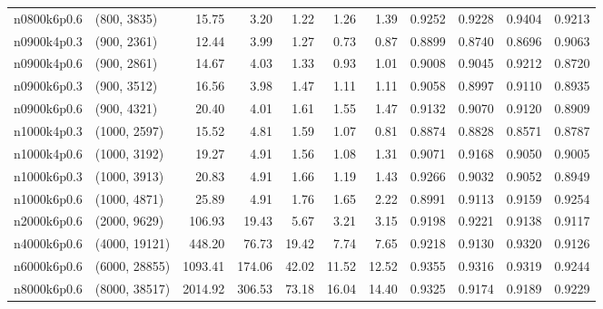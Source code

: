 \begin{tabular}{llrrrrrrrrr}
n0800k6p0.6 &   (800, 3835) &   15.75 &   3.20 &  1.22 &  1.26 &   1.39 &   0.9252 &   0.9228 &     0.9404 &      0.9213 \\
n0900k4p0.3 &   (900, 2361) &   12.44 &   3.99 &  1.27 &  0.73 &   0.87 &   0.8899 &   0.8740 &     0.8696 &      0.9063 \\
n0900k4p0.6 &   (900, 2861) &   14.67 &   4.03 &  1.33 &  0.93 &   1.01 &   0.9008 &   0.9045 &     0.9212 &      0.8720 \\
n0900k6p0.3 &   (900, 3512) &   16.56 &   3.98 &  1.47 &  1.11 &   1.11 &   0.9058 &   0.8997 &     0.9110 &      0.8935 \\
n0900k6p0.6 &   (900, 4321) &   20.40 &   4.01 &  1.61 &  1.55 &   1.47 &   0.9132 &   0.9070 &     0.9120 &      0.8909 \\
n1000k4p0.3 &  (1000, 2597) &   15.52 &   4.81 &  1.59 &  1.07 &   0.81 &   0.8874 &   0.8828 &     0.8571 &      0.8787 \\
n1000k4p0.6 &  (1000, 3192) &   19.27 &   4.91 &  1.56 &  1.08 &   1.31 &   0.9071 &   0.9168 &     0.9050 &      0.9005 \\
n1000k6p0.3 &  (1000, 3913) &   20.83 &   4.91 &  1.66 &  1.19 &   1.43 &   0.9266 &   0.9032 &     0.9052 &      0.8949 \\
n1000k6p0.6 &  (1000, 4871) &   25.89 &   4.91 &  1.76 &  1.65 &   2.22 &   0.8991 &   0.9113 &     0.9159 &      0.9254 \\
n2000k6p0.6 &  (2000, 9629) &  106.93 &  19.43 &  5.67 &  3.21 &   3.15 &   0.9198 &   0.9221 &     0.9138 &      0.9117 \\
n4000k6p0.6 & (4000, 19121) &  448.20 &  76.73 & 19.42 &  7.74 &   7.65 &   0.9218 &   0.9130 &     0.9320 &      0.9126 \\
n6000k6p0.6 & (6000, 28855) & 1093.41 & 174.06 & 42.02 & 11.52 &  12.52 &   0.9355 &   0.9316 &     0.9319 &      0.9244 \\
n8000k6p0.6 & (8000, 38517) & 2014.92 & 306.53 & 73.18 & 16.04 &  14.40 &   0.9325 &   0.9174 &     0.9189 &      0.9229 \\
\bottomrule
\end{tabular}
